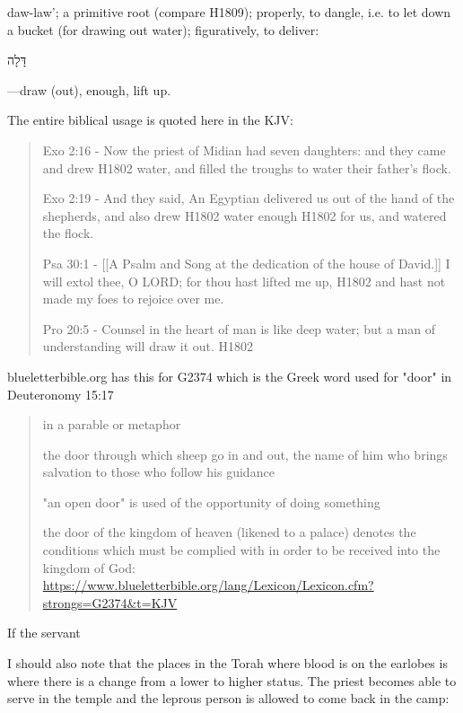 \documentclass[11pt]{article}
\begin{document}
 daw-law'; a primitive root (compare H1809); properly, to dangle, i.e. to let down a bucket (for drawing out water); figuratively, to deliver:
 \begin{hebrew}
 דָּלָה        
 \end{hebrew}
—draw (out), enough, lift up.\newline

The entire biblical usage is quoted here in the KJV:
\begin{quote}
Exo 2:16 - Now the priest of Midian had seven daughters: and they came and drew H1802 water, and filled the troughs to water their father's flock.

Exo 2:19 - And they said, An Egyptian delivered us out of the hand of the shepherds, and also drew H1802 water enough H1802 for us, and watered the flock.

Psa 30:1 - [[A Psalm and Song at the dedication of the house of David.]] I will extol thee, O LORD; for thou hast lifted me up, H1802 and hast not made my foes to rejoice over me.

Pro 20:5 - Counsel in the heart of man is like deep water; but a man of understanding will draw it out. H1802
\end{quote}

blueletterbible.org has this for G2374 which is the Greek word used for "door" in Deuteronomy 15:17
\begin{quote}
in a parable or metaphor

the door through which sheep go in and out, the name of him who brings salvation to those who follow his guidance

"an open door" is used of the opportunity of doing something

the door of the kingdom of heaven (likened to a palace) denotes the conditions which must be complied with in order to be received into the kingdom of God:
\url{https://www.blueletterbible.org/lang/Lexicon/Lexicon.cfm?strongs=G2374&t=KJV}
\end{quote}

If the servant 

I should also note that the places in the Torah where blood is on the earlobes is where there is a change from a lower to higher status. The priest becomes able to serve in the temple and the leprous person is allowed to come back in the camp:
\end{document}
